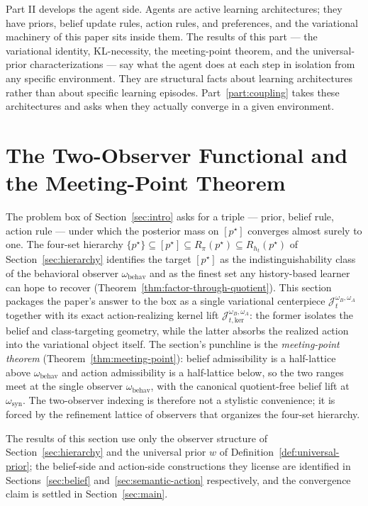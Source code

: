 \documentclass[11pt]{article}
\theoremstyle{definition}
\theoremstyle{remark}
\begin{document}
Part II develops the agent side. Agents are active learning architectures; they have priors, belief update rules, action rules, and preferences, and the variational machinery of this paper sits inside them. The results of this part --- the variational identity, KL-necessity, the meeting-point theorem, and the universal-prior characterizations --- say what the agent does at each step in isolation from any specific environment. They are structural facts about learning architectures rather than about specific learning episodes. Part~\ref{part:coupling} takes these architectures and asks when they actually converge in a given environment.

\section{The Two-Observer Functional and the Meeting-Point Theorem}
\label{sec:functional}

The problem box of Section~\ref{sec:intro} asks for a triple --- prior, belief rule, action rule --- under which the posterior mass on $[p^\star]$ converges almost surely to one. The four-set hierarchy $\{p^\star\}\subseteq[p^\star]\subseteq R_\pi(p^\star)\subseteq R_{h_t}(p^\star)$ of Section~\ref{sec:hierarchy} identifies the target $[p^\star]$ as the indistinguishability class of the behavioral observer $\omega_{\mathrm{behav}}$ and as the finest set any history-based learner can hope to recover (Theorem~\ref{thm:factor-through-quotient}). This section packages the paper's answer to the box as a single variational centerpiece $\mathcal J_t^{\omega_B,\omega_A}$ together with its exact action-realizing kernel lift $\mathcal J_{t,\mathrm{ker}}^{\omega_B,\omega_A}$: the former isolates the belief and class-targeting geometry, while the latter absorbs the realized action into the variational object itself. The section's punchline is the \emph{meeting-point theorem} (Theorem~\ref{thm:meeting-point}): belief admissibility is a half-lattice above $\omega_{\mathrm{behav}}$ and action admissibility is a half-lattice below, so the two ranges meet at the single observer $\omega_{\mathrm{behav}}$, with the canonical quotient-free belief lift at $\omega_{\mathrm{syn}}$. The two-observer indexing is therefore not a stylistic convenience; it is forced by the refinement lattice of observers that organizes the four-set hierarchy.

The results of this section use only the observer structure of Section~\ref{sec:hierarchy} and the universal prior $w$ of Definition~\ref{def:universal-prior}; the belief-side and action-side constructions they license are identified in Sections~\ref{sec:belief} and~\ref{sec:semantic-action} respectively, and the convergence claim is settled in Section~\ref{sec:main}.
\end{document}
